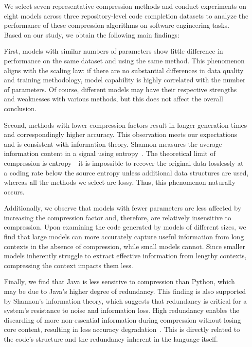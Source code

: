 We select seven representative compression methods and conduct experiments on eight models across three repository-level code completion datasets to analyze the performance of these compression algorithms on software engineering tasks. Based on our study, we obtain the following main findings:

First, models with similar numbers of parameters show little difference in performance on the same dataset and using the same method. This phenomenon aligns with the scaling law: if there are no substantial differences in data quality and training methodology, model capability is highly correlated with the number of parameters. Of course, different models may have their respective strengths and weaknesses with various methods, but this does not affect the overall conclusion.

Second, methods with lower compression factors result in longer generation times and correspondingly higher accuracy. This observation meets our expectations and is consistent with information theory. Shannon measures the average information content in a signal using entropy~\cite{shannon1948mathematical}. The theoretical limit of compression is entropy—it is impossible to recover the original data losslessly at a coding rate below the source entropy unless additional data structures are used, whereas all the methods we select are lossy. Thus, this phenomenon naturally occurs.

Additionally, we observe that models with fewer parameters are less affected by increasing the compression factor and, therefore, are relatively insensitive to compression. Upon examining the code generated by models of different sizes, we find that large models can more accurately capture useful information from long contexts in the absence of compression, while small models cannot. Since smaller models inherently struggle to extract effective information from lengthy contexts, compressing the context impacts them less.

Finally, we find that Java is less sensitive to compression than Python, which may be due to Java’s higher degree of redundancy. This finding is also supported by Shannon's information theory, which suggests that redundancy is critical for a system's resistance to noise and information loss. High redundancy enables the discarding of more non-essential information during compression without losing core content, resulting in less accuracy degradation~\cite{shannon1951prediction}. This is directly related to the code's structure and the redundancy inherent in the language itself.

